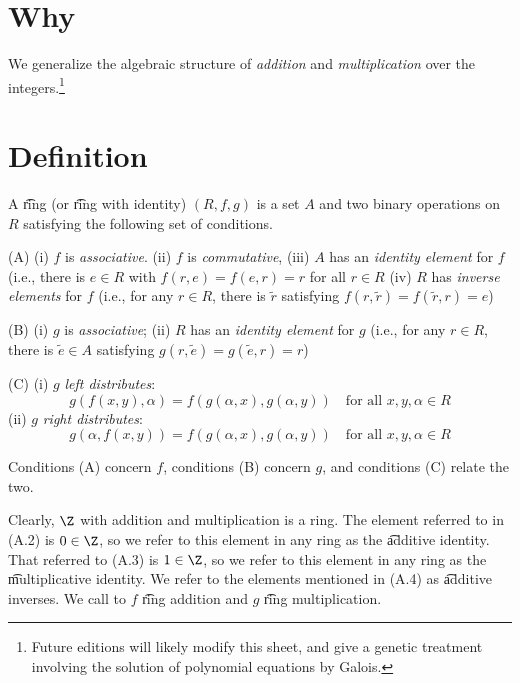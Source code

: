 
\section*{Why}

We generalize the algebraic structure of \textit{addition} and \textit{multiplication} over the integers.\footnote{Future editions will likely modify this sheet, and give a genetic treatment involving the solution of polynomial equations by Galois.}

\section*{Definition}

A \t{ring} (or \t{ring with identity}) $(R, f, g)$ is a set $A$ and two binary operations on $R$ satisfying the following set of conditions.

(A)
(i) $f$ is \textit{associative}.
(ii) $f$ is \textit{commutative},
(iii) $A$ has an \textit{identity element} for $f$ (i.e., there is $e \in R$ with $f(r, e) = f(e, r) = r$ for all $r \in R$
(iv) $R$ has \textit{inverse elements} for $f$ (i.e., for any $r \in R$, there is $\tilde{r} $ satisfying $f(r,\tilde{r}) = f(\tilde{r}, r) = e$)

(B)
(i) $g$ is \textit{associative};
(ii) $R$ has an \textit{identity element} for $g$ (i.e., for any $r \in R$, there is $\tilde{e} \in A$ satisfying $g(r, \tilde{e}) = g(\tilde{e},r) = r$)

(C)
(i) $g$ \textit{left distributes}:
\[
g(f(x, y), \alpha ) = f(g(\alpha ,x), g(\alpha ,y)) \quad \text{for all } x, y, \alpha  \in R
\]
(ii) $g$ \textit{right distributes}:
\[
g(\alpha , f(x,y)) = f(g(\alpha ,x), g(\alpha ,y)) \quad \text{for all } x, y, \alpha  \in R
\]

Conditions (A) concern $f$, conditions (B) concern $g$, and conditions (C) relate the two.

Clearly, $\Z $ with addition and multiplication is a ring.
The element referred to in (A.2) is $0 \in \Z $, so we refer to this element in any ring as the \t{additive identity}.
That referred to (A.3) is $1 \in \Z $, so we refer to this element in any ring as the \t{multiplicative identity}.
We refer to the elements mentioned in (A.4) as \t{additive inverses}.
We call to $f$ \t{ring addition} and $g$ \t{ring multiplication}.


%    

